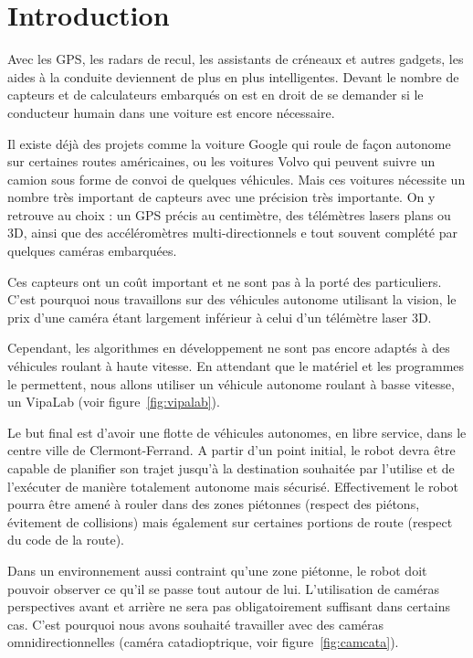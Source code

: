 \section{Introduction}

Avec les GPS, les radars de recul, les assistants de créneaux et autres gadgets, les aides à la conduite deviennent de plus en plus intelligentes.
Devant le nombre de capteurs et de calculateurs embarqués on est en droit de se demander si le conducteur humain dans une voiture est encore nécessaire.

Il existe déjà des projets comme la voiture Google qui roule de façon autonome sur certaines routes américaines, ou les voitures Volvo qui peuvent suivre un camion sous forme de convoi de quelques véhicules.
Mais ces voitures nécessite un nombre très important de capteurs avec une précision très importante.
On y retrouve au choix : un GPS précis au centimètre, des télémètres lasers plans ou 3D, ainsi que des accéléromètres multi-directionnels e tout souvent complété par quelques caméras embarquées.

Ces capteurs ont un coût important et ne sont pas à la porté des particuliers.
C'est pourquoi nous travaillons sur des véhicules autonome utilisant la vision, le prix d'une caméra étant largement inférieur à celui d'un télémètre laser 3D.

Cependant, les algorithmes en développement ne sont pas encore adaptés à des véhicules roulant à haute vitesse.
En attendant que le matériel et les programmes le permettent, nous allons utiliser un véhicule autonome roulant à basse vitesse, un VipaLab (voir figure~\ref{fig:vipalab}).


Le but final est d'avoir une flotte de véhicules autonomes, en libre service, dans le centre ville de Clermont-Ferrand.
A partir d'un point initial, le robot devra être capable de planifier son trajet jusqu'à la destination souhaitée par l'utilise et de l'exécuter de manière totalement autonome mais sécurisé.
Effectivement le robot pourra être amené à rouler dans des zones piétonnes (respect des piétons, évitement de collisions) mais également sur certaines portions de route (respect du code de la route).

Dans un environnement aussi contraint qu'une zone piétonne, le robot doit pouvoir observer ce qu'il se passe tout autour de lui.
L'utilisation de caméras perspectives avant et arrière ne sera pas obligatoirement suffisant dans certains cas.
C'est pourquoi nous avons souhaité travailler avec des caméras omnidirectionnelles (caméra catadioptrique, voir figure~\ref{fig:camcata}).

